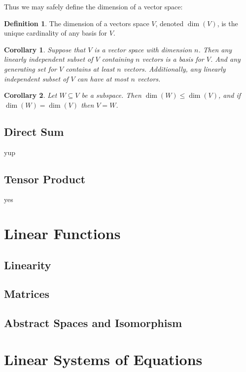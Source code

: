 \documentclass[oneside, 12pt]{book}
\newtheorem{cor}{Corollary}[section]
\theoremstyle{definition}
\newtheorem{defn}{Definition}[section]
\begin{document}
Thus we may safely define the dimension of a vector space:
\begin{defn}
  \label{defn_dim}
The dimension of a vectors space $V$, denoted $\dim(V)$, is the unique cardinality of any basis for $V$.
\end{defn}
\begin{cor}
\label{cor_base}
Suppose that $V$ is a vector space with dimension $n$. Then any linearly independent subset of $V$ containing $n$ vectors is a basis for $V$.
And any generating set for $V$ contains at least $n$ vectors.
Additionally, any linearly independent subset of $V$ can have at most $n$ vectors.
\end{cor}
\begin{cor}
  \label{cor_bassub}
Let $W\subseteq V$ be a subspace. Then $\dim(W)\leq \dim(V)$, and if $\dim(W)=\dim(V)$ then $V=W$.
\end{cor}
\section{Direct Sum}
yup
\section{Tensor Product}
yes
\chapter{Linear Functions}
\section{Linearity}
\section{Matrices}
\section{Abstract Spaces and Isomorphism}
\chapter{Linear Systems of Equations}
\end{document}
